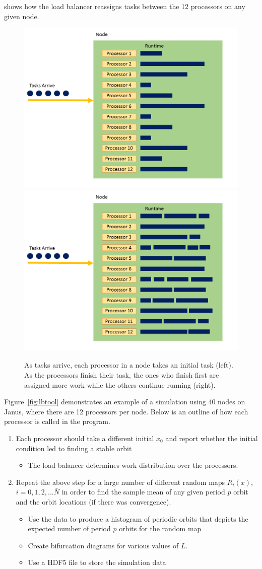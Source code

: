 shows how the load balancer reassigns tasks between the 12 processors
on any given node.
\begin{figure}[htp]
\caption[Processor work distribution before and after load
balancing]{As tasks arrive, each processor in a node takes an initial
  task (left). As the processors finish their task, the ones who finish first are
assigned more work while the others continue running (right).}\label{fig:loadbalance_node}
\centering
\includegraphics[width=.5\textwidth]{figs/loadbalance_node_start.png}\hfill
\includegraphics[width=.5\textwidth]{figs/loadbalance_node_end.png}
\end{figure}
Figure~\ref{fig:lbtool} demonstrates an example of a simulation
using 40 nodes on Janus, where there are 12 processors per
node. Below is an outline of how each processor is called in the program. 
\begin{enumerate}
\item Each processor should take a different initial $x_0$ and report
  whether the initial condition led to finding a stable orbit  
\begin{itemize}
\item The load balancer determines work distribution over the processors.
\end{itemize}
\item Repeat the above step for a large number of different random
  maps $R_i(x)$, $i = 0, 1, 2,... \bar{N}$ in order to find the sample
  mean of any given period $p$ orbit and the orbit locations
  (if there was convergence).
\begin{itemize}
\item Use the data to produce a histogram of periodic orbits that depicts the expected number of period $p$ orbits for the random map
\item Create bifurcation diagrams for various values of $L$.
\item Use a HDF5 file to store the simulation data
\end{itemize}
\end{enumerate}

